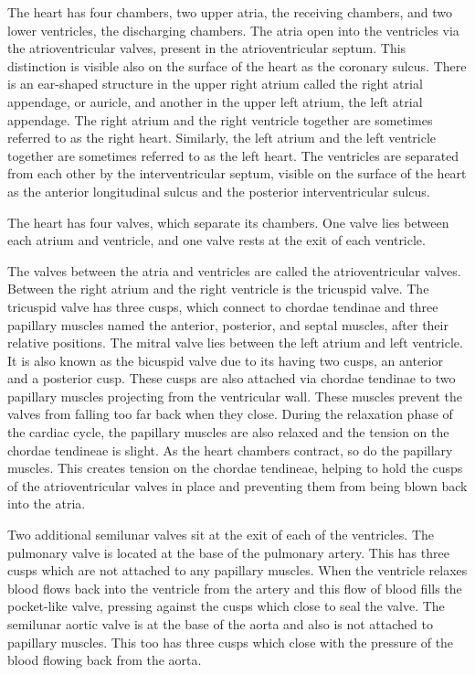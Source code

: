 \documentclass[]{book}
\theoremstyle{definition}
\theoremstyle{definition}
\theoremstyle{definition}
\theoremstyle{remark}
\begin{document}
The heart has four chambers, two upper atria, the receiving chambers,
and two lower ventricles, the discharging chambers. The atria open into
the ventricles via the atrioventricular valves, present in the
atrioventricular septum. This distinction is visible also on the surface
of the heart as the coronary sulcus. There is an ear-shaped structure in
the upper right atrium called the right atrial appendage, or auricle,
and another in the upper left atrium, the left atrial appendage. The
right atrium and the right ventricle together are sometimes referred to
as the right heart. Similarly, the left atrium and the left ventricle
together are sometimes referred to as the left heart. The ventricles are
separated from each other by the interventricular septum, visible on the
surface of the heart as the anterior longitudinal sulcus and the
posterior interventricular sulcus.

The heart has four valves, which separate its chambers. One valve lies
between each atrium and ventricle, and one valve rests at the exit of
each ventricle.

The valves between the atria and ventricles are called the
atrioventricular valves. Between the right atrium and the right
ventricle is the tricuspid valve. The tricuspid valve has three cusps,
which connect to chordae tendinae and three papillary muscles named the
anterior, posterior, and septal muscles, after their relative positions.
The mitral valve lies between the left atrium and left ventricle. It is
also known as the bicuspid valve due to its having two cusps, an
anterior and a posterior cusp. These cusps are also attached via chordae
tendinae to two papillary muscles projecting from the ventricular wall.
These muscles prevent the valves from falling too far back when they
close. During the relaxation phase of the cardiac cycle, the papillary
muscles are also relaxed and the tension on the chordae tendineae is
slight. As the heart chambers contract, so do the papillary muscles.
This creates tension on the chordae tendineae, helping to hold the cusps
of the atrioventricular valves in place and preventing them from being
blown back into the atria.

Two additional semilunar valves sit at the exit of each of the
ventricles. The pulmonary valve is located at the base of the pulmonary
artery. This has three cusps which are not attached to any papillary
muscles. When the ventricle relaxes blood flows back into the ventricle
from the artery and this flow of blood fills the pocket-like valve,
pressing against the cusps which close to seal the valve. The semilunar
aortic valve is at the base of the aorta and also is not attached to
papillary muscles. This too has three cusps which close with the
pressure of the blood flowing back from the aorta.
\end{document}
